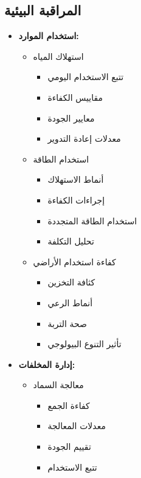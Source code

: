 \subsection{المراقبة البيئية}
\begin{itemize}
    \item \textbf{استخدام الموارد:}
    \begin{itemize}
        \item استهلاك المياه
        \begin{itemize}
            \item تتبع الاستخدام اليومي
            \item مقاييس الكفاءة
            \item معايير الجودة
            \item معدلات إعادة التدوير
        \end{itemize}
        
        \item استخدام الطاقة
        \begin{itemize}
            \item أنماط الاستهلاك
            \item إجراءات الكفاءة
            \item استخدام الطاقة المتجددة
            \item تحليل التكلفة
        \end{itemize}
        
        \item كفاءة استخدام الأراضي
        \begin{itemize}
            \item كثافة التخزين
            \item أنماط الرعي
            \item صحة التربة
            \item تأثير التنوع البيولوجي
        \end{itemize}
    \end{itemize}
    
    \item \textbf{إدارة المخلفات:}
    \begin{itemize}
        \item معالجة السماد
        \begin{itemize}
            \item كفاءة الجمع
            \item معدلات المعالجة
            \item تقييم الجودة
            \item تتبع الاستخدام
        \end{itemize}
        

\end{itemize}
\end{itemize}

